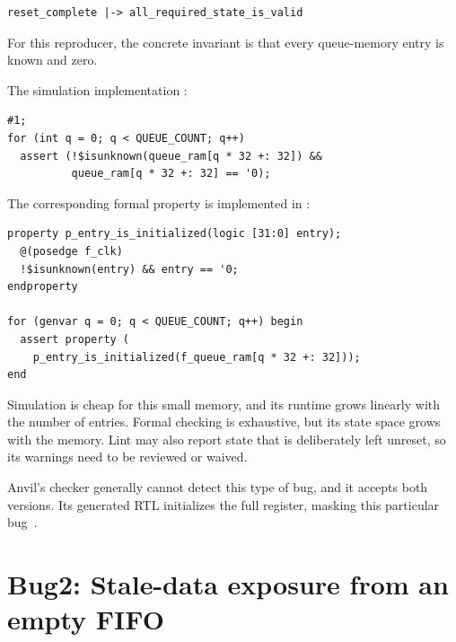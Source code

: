 \documentclass[conference]{IEEEtran}
\newcommand{\bugsection}[2]{%
  \refstepcounter{section}%
  \setcounter{subsection}{0}%
  \section*{Bug#1: #2}%
}
\begin{document}
\begin{lstlisting}
reset_complete |-> all_required_state_is_valid
\end{lstlisting}

For this reproducer, the concrete invariant is that every
queue-memory entry is known and zero.

The simulation implementation \cite{bug1-simulation-check}:

\begin{lstlisting}
#1;
for (int q = 0; q < QUEUE_COUNT; q++)
  assert (!$isunknown(queue_ram[q * 32 +: 32]) &&
          queue_ram[q * 32 +: 32] == '0);
\end{lstlisting}

The corresponding formal property is implemented in
\cite{bug1-formal-check}:

\begin{lstlisting}
property p_entry_is_initialized(logic [31:0] entry);
  @(posedge f_clk)
  !$isunknown(entry) && entry == '0;
endproperty

for (genvar q = 0; q < QUEUE_COUNT; q++) begin
  assert property (
    p_entry_is_initialized(f_queue_ram[q * 32 +: 32]));
end
\end{lstlisting}

Simulation is cheap for this small memory, and its runtime grows linearly with
the number of entries. Formal checking is exhaustive, but its state space
grows with the memory. Lint may also report state that is deliberately left
unreset, so its warnings need to be reviewed or waived.

Anvil's checker generally cannot detect this type of bug, and it accepts both
versions. Its generated RTL initializes the full register, masking this
particular bug~\cite{bug1-anvil-buggy,bug1-anvil-fixed,
bug1-anvil-results}.























\bugsection{2}{Stale-data exposure from an empty FIFO}
\end{document}
